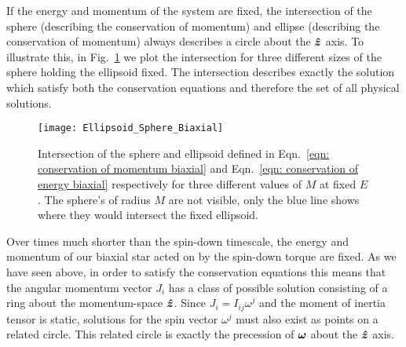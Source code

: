 \documentclass[../full_thesis/full_thesis.tex]{subfiles}
\begin{document}
If the energy and momentum of the system are fixed, the intersection of the
sphere (describing the conservation of momentum) and ellipse (describing the
conservation of momentum) always describes a circle about the $\boldsymbol{\hat{z}}$ axis. To illustrate
this, in Fig.~\ref{fig: plot sphere ellipse biaxial} we plot the intersection
for three different sizes of the sphere holding the ellipsoid fixed. The
intersection describes exactly the solution which satisfy both the conservation
equations and therefore the set of all physical solutions. 
\begin{figure}[ht]
\centering
\texttt{[image: Ellipsoid\_Sphere\_Biaxial]}
\caption{Intersection of the sphere and ellipsoid defined in Eqn.~\eqref{eqn:
conservation of momentum biaxial} and Eqn.~\eqref{eqn: conservation of energy
biaxial} respectively for three different values of $M$ at
fixed $E$. The sphere's of radius $M$ are not visible, only the blue line shows
where they would intersect the fixed ellipsoid.}
\label{fig: plot sphere ellipse biaxial}
\end{figure}

Over times much shorter than the spin-down timescale, the energy and momentum
of our biaxial star acted on by the spin-down torque are fixed. As we have seen
above, in order to satisfy the conservation equations this means that the
angular momentum vector $J_i$ has a class of possible solution consisting of a
ring about the momentum-space $\boldsymbol{\hat{z}}$.  Since $J_{i}=I_{ij}\omega^{j}$ and the
moment of inertia tensor is static, solutions for the spin vector $\omega^j$
must also exist as points on a related circle. This related circle is exactly
the precession of $\boldsymbol{\omega}$ about the $\boldsymbol{\hat{z}}$ axis.
\end{document}

